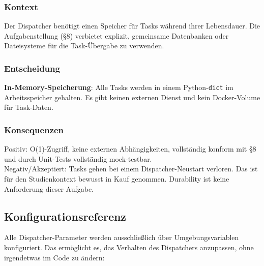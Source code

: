 \subsubsection*{Kontext}

Der Dispatcher benötigt einen Speicher für Tasks während ihrer Lebensdauer.
Die Aufgabenstellung (§8) verbietet explizit, gemeinsame Datenbanken oder
Dateisysteme für die Task-Übergabe zu verwenden.

\subsubsection*{Entscheidung}

\textbf{In-Memory-Speicherung}: Alle Tasks werden in einem Python-\texttt{dict}
im Arbeitsspeicher gehalten. Es gibt keinen externen Dienst und kein Docker-Volume
für Task-Daten.

\subsubsection*{Konsequenzen}

Positiv: O(1)-Zugriff, keine externen Abhängigkeiten, vollständig konform mit §8
und durch Unit-Tests vollständig mock-testbar.
\\
Negativ/Akzeptiert: Tasks gehen bei einem Dispatcher-Neustart verloren.
Das ist für den Studienkontext bewusst in Kauf genommen. Durability ist
keine Anforderung dieser Aufgabe.

\subsection{Konfigurationsreferenz}

Alle Dispatcher-Parameter werden ausschließlich über Umgebungsvariablen
konfiguriert. Das ermöglicht es, das Verhalten des Dispatchers anzupassen,
ohne irgendetwas im Code zu ändern:

